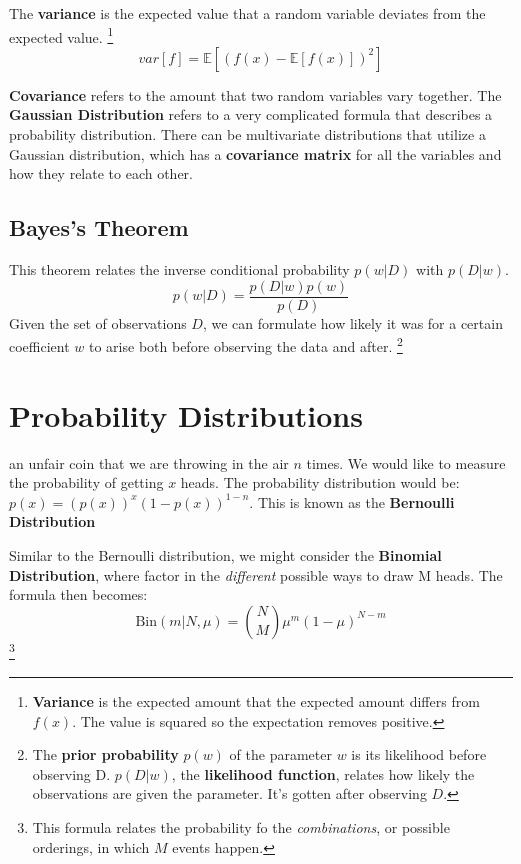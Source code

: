\documentclass{tufte-handout}
\begin{document}
		The \textbf{variance} is the expected value that a random variable deviates from the 
		expected value. \footnote{\textbf{Variance} is the expected amount that the 
		expected amount differs from $f(x)$. 
		The value is squared so the expectation removes positive.}
		\[ var[f] = \mathbb{E}[(f(x) - \mathbb{E}[f(x)])^{2}]\]

		\textbf{Covariance} refers to the amount that two random variables vary together. The 
		\textbf{Gaussian Distribution} refers to a very complicated formula that describes a
		probability distribution.  There can be multivariate distributions that utilize a 
		Gaussian distribution, which has a \textbf{covariance matrix} for all the variables and
		how they relate to each other. 

	\subsection{Bayes's Theorem}
		This theorem relates the inverse conditional probability $p(w|D)$ with $p(D|w)$. 
		\[ p(w|D) = \frac{p(D|w)p(w)}{p(D)}\]
		Given the set of observations $D$, we can formulate how likely it was for a certain 
		coefficient $w$ to arise both before observing the data and after. \footnote{The 
		\textbf{prior probability} $p(w)$ of the parameter $w$ is its likelihood 
		before observing D. $p(D|w)$, the \textbf{likelihood function}, relates how likely
		the observations are given the parameter. It's gotten after observing $D$.} 
\section{Probability Distributions}
	 an unfair coin that we are throwing in the air $n$ times. We would like
	to measure the probability of getting $x$ heads. The probability distribution would be:
	$p(x)=(p(x))^{x}(1-p(x))^{1-n}$. This is known as the \textbf{Bernoulli Distribution}

	Similar to the Bernoulli distribution, we might consider the \textbf{Binomial Distribution},
	where factor in the \textit{different} possible ways to draw M heads. The formula then becomes:
	\[ \textrm{Bin}(m|N,\mu) = {N\choose M}\mu^{m}(1-\mu)^{N-m}\]\footnote{This formula relates the 
	probability fo the \textit{combinations}, or possible orderings, in which $M$ events happen.}
\end{document}
